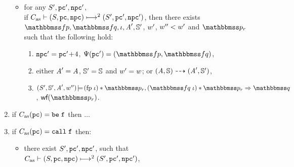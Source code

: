 \begin{definition}
\begin{enumerate}[1.]
\begin{itemize}
                \item for any $\state', \pc', \npc'$, \\ if
                $\multilptrans{\asmimp}{2}{(\state, \pc, \npc)}{(\state', \pc', \npc')}$,
                then there exists $\relspecpre, \relspecpost, \lgvl, 
                \primcom', \hpstate'$, $\word'$, 
                $\word'' < \word'$ and $\relastP_r$ 
                such that the following hold: 
                \begin{enumerate}[(1)]
                    \item %
                        $\npc' = \pc' \!+\! 4$,
                        $\Cspec (\pc') = (\relspecpre, \relspecpost)$,
                    \item either $\primcom' = \primcom$, 
                    $\hpstate' = \hpstate$ and $\word' = \word$; 
                    or 
                    $\primTrans{(\primcom, \hpstate)}
                        {(\primcom', \hpstate')}$,
                    \item 
                        $\asrtmodel{(\state', \hpstate', \primcom', \word'')}
                        {(\specpre \; \lgvl) \sepstar \relastP_r},  
                        (\relspecpost \; \lgvl) \sepstar \relastP_r 
                        \Rightarrow \relastQ$, $\wfFrm(\relastP_r)$. 
                \end{enumerate}
            \end{itemize}

            \item if $\asmimp(\pc) = \be \; \lab{}$ then $\dots$ 
		
            \item if $\asmimp (\pc) = \call \; \lab{}$ then:
            \begin{itemize}
                \item there exist $\state', \pc', \npc'$, such that
                \\
                $\multilptrans{\asmimp}{2}{(\state, \pc, \npc)}
                    {(\state', \pc', \npc')}$,
                

\end{itemize}
\end{enumerate}
\end{definition}
